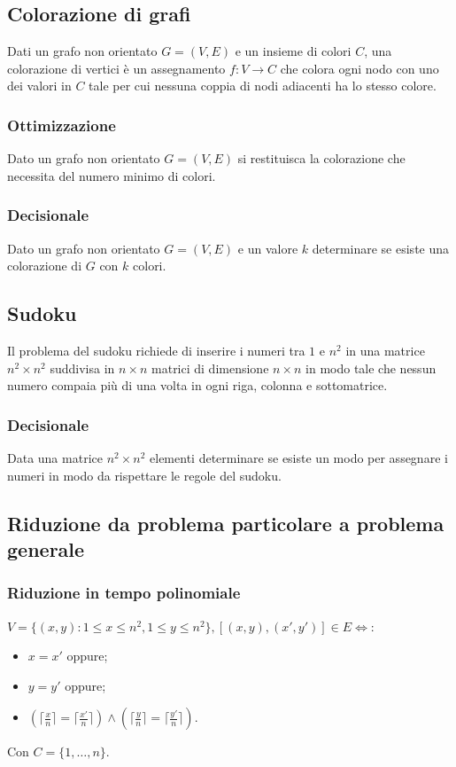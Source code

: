 \subsection{Colorazione di grafi}
Dati un grafo non orientato $G=(V, E)$ e un insieme di colori $C$, una colorazione di vertici \`e un assegnamento $f:V\rightarrow C$ che colora ogni nodo con uno dei valori in $C$ tale 
per cui nessuna coppia di nodi adiacenti ha lo stesso colore.
\subsubsection{Ottimizzazione}
Dato un grafo non orientato $G=(V, E)$ si restituisca la colorazione che necessita del numero minimo di colori.
\subsubsection{Decisionale}
Dato un grafo non orientato $G=(V, E)$ e un valore $k$ determinare se esiste una colorazione di $G$ con $k$ colori.
\subsection{Sudoku}
Il problema del sudoku richiede di inserire i numeri tra $1$ e $n^2$ in una matrice $n^2\times n^2$ suddivisa in $n\times n$ matrici di dimensione $n\times n$ in modo tale che nessun 
numero compaia pi\`u di una volta in ogni riga, colonna e sottomatrice.
\subsubsection{Decisionale}
Data una matrice $n^2\times n^2$ elementi determinare se esiste un modo per assegnare i numeri in modo da rispettare le regole del sudoku.
\subsection{Riduzione da problema particolare a problema generale}
\subsubsection{Riduzione in tempo polinomiale}
$V = \{(x, y):1 \le x\le n^2, 1\le y\le n^2\}, [(x, y), (x', y')]\in E\Leftrightarrow$:
\begin{itemize}
	\item $x = x'$ oppure;
	\item $y = y'$ oppure;
	\item $(\lceil\frac{x}{n}\rceil = \lceil\frac{x'}{n}\rceil)\land(\lceil\frac{y}{n}\rceil = \lceil\frac{y'}{n}\rceil)$.
\end{itemize}
Con $C = \{1, \dots, n\}$.
